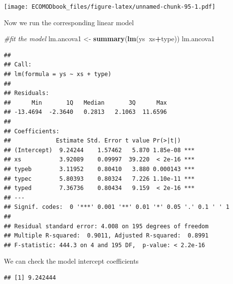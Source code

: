 \documentclass[
]{book}
\newenvironment{Shaded}{\begin{snugshade}}{\end{snugshade}}
\newcommand{\CommentTok}[1]{\textcolor[rgb]{0.56,0.35,0.01}{\textit{#1}}}
\newcommand{\DecValTok}[1]{\textcolor[rgb]{0.00,0.00,0.81}{#1}}
\newcommand{\KeywordTok}[1]{\textcolor[rgb]{0.13,0.29,0.53}{\textbf{#1}}}
\newcommand{\NormalTok}[1]{#1}
\newcommand{\OperatorTok}[1]{\textcolor[rgb]{0.81,0.36,0.00}{\textbf{#1}}}
\newcommand{\StringTok}[1]{\textcolor[rgb]{0.31,0.60,0.02}{#1}}
\begin{document}
\texttt{[image: ECOMODbook\_files/figure-latex/unnamed-chunk-95-1.pdf]}

Now we run the corresponding linear model

\begin{Shaded}
\begin{Highlighting}[]
\CommentTok{#fit the model}
\NormalTok{lm.ancova1 <-}\StringTok{ }\KeywordTok{summary}\NormalTok{(}\KeywordTok{lm}\NormalTok{(ys}\OperatorTok{~}\NormalTok{xs}\OperatorTok{+}\NormalTok{type))}
\NormalTok{lm.ancova1}
\end{Highlighting}
\end{Shaded}

\begin{verbatim}
## 
## Call:
## lm(formula = ys ~ xs + type)
## 
## Residuals:
##      Min       1Q   Median       3Q      Max 
## -13.4694  -2.3640   0.2813   2.1063  11.6596 
## 
## Coefficients:
##             Estimate Std. Error t value Pr(>|t|)    
## (Intercept)  9.24244    1.57462   5.870 1.85e-08 ***
## xs           3.92089    0.09997  39.220  < 2e-16 ***
## typeb        3.11952    0.80410   3.880 0.000143 ***
## typec        5.80393    0.80324   7.226 1.10e-11 ***
## typed        7.36736    0.80434   9.159  < 2e-16 ***
## ---
## Signif. codes:  0 '***' 0.001 '**' 0.01 '*' 0.05 '.' 0.1 ' ' 1
## 
## Residual standard error: 4.008 on 195 degrees of freedom
## Multiple R-squared:  0.9011,	Adjusted R-squared:  0.8991 
## F-statistic: 444.3 on 4 and 195 DF,  p-value: < 2.2e-16
\end{verbatim}

We can check the model intercept coefficients

\begin{Shaded}
\end{Shaded}

\begin{verbatim}
## [1] 9.242444
\end{verbatim}

\begin{Shaded}
\end{Shaded}
\end{document}

